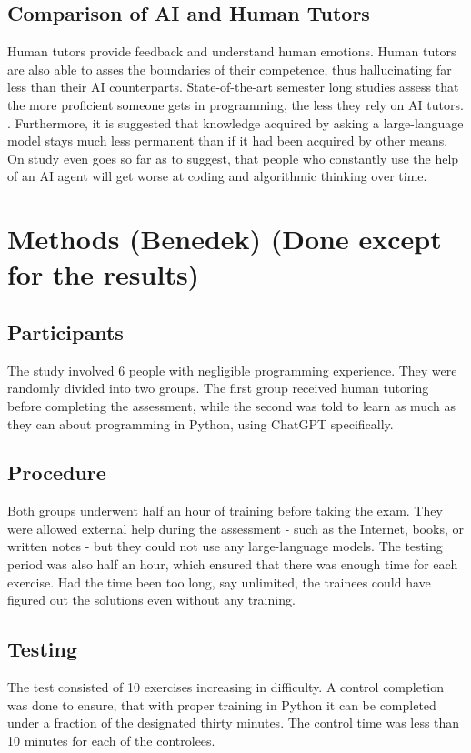 \documentclass[12pt]{article}  %
\begin{document}
\subsection{Comparison of AI and Human Tutors}
Human tutors provide feedback and understand human emotions. Human tutors are also able to asses the boundaries of their competence, thus hallucinating far less than their AI counterparts. State-of-the-art semester long studies assess that the more proficient someone gets in programming, the less they rely on AI tutors. \cite{https://dl.acm.org/doi/abs/10.1145/3657604.3662036}. Furthermore, it is suggested that knowledge acquired by asking a large-language model stays much less permanent than if it had been acquired by other means. On study even goes so far as to suggest, that people who constantly use the help of an AI agent will get worse at coding and algorithmic thinking over time.  \cite{https://dl.acm.org/doi/pdf/10.1145/3632620.3671116}

\section{Methods (Benedek) (Done except for the results)}

\subsection{Participants}
The study involved 6 people with negligible programming experience. They were randomly divided into two groups. The first group received human tutoring before completing the assessment, while the second was told to learn as much as they can about programming in Python, using ChatGPT specifically. 

\subsection{Procedure}
Both groups underwent half an hour of training before taking the exam. They were allowed external help during the assessment - such as the Internet, books, or written notes - but they could not use any large-language models. The testing period was also half an hour, which ensured that there was enough time for each exercise. Had the time been too long, say unlimited, the trainees could have figured out the solutions even without any training.  

\subsection{Testing}
The test consisted of 10 exercises increasing in difficulty. A control completion was done to ensure, that with proper training in Python it can be completed under a fraction of the designated thirty minutes. The control time was less than 10 minutes for each of the controlees.
\end{document}
